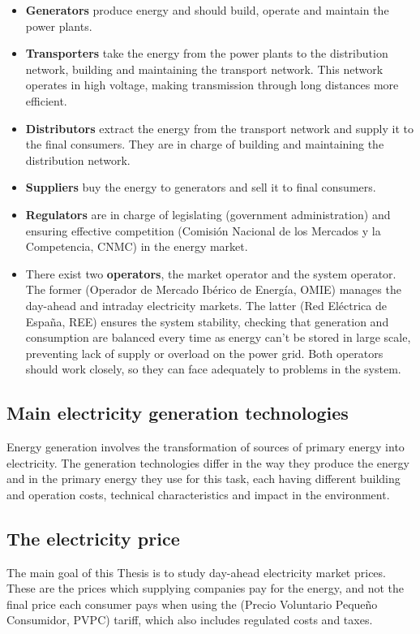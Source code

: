 \begin{itemize}
    \item \textbf{Generators} produce energy and should build, operate and maintain the power plants.
    \item \textbf{Transporters} take the energy from the power plants to the distribution network, building and maintaining the transport network. This network operates in high voltage, making transmission through long distances more efficient.
    \item \textbf{Distributors} extract the energy from the transport network and supply it to the final consumers. They are in charge of building and maintaining the distribution network.
    \item \textbf{Suppliers} buy the energy to generators and sell it to final consumers.
    \item \textbf{Regulators} are in charge of legislating (government administration) and ensuring effective competition (Comisión Nacional de los Mercados y la Competencia, CNMC) in the energy market.
    \item There exist two \textbf{operators}, the market operator and the system operator. The former (Operador de Mercado Ibérico de Energía, OMIE) manages the day-ahead and intraday electricity markets. The latter (Red Eléctrica de España, REE) ensures the system stability, checking that generation and consumption are balanced every time as energy can't be stored in large scale, preventing lack of supply or overload on the power grid. Both operators should work closely, so they can face adequately to problems in the system.
\end{itemize}

\subsection{Main electricity generation technologies}
Energy generation involves the transformation of sources of primary energy into electricity.
The generation technologies differ in the way they produce the energy and in the primary energy they use for this task, each having different building and operation costs, technical characteristics and impact in the environment. \cite{subasta-electrica-totalenergies}


\subsection{The electricity price}
The main goal of this Thesis is to study day-ahead electricity market prices.
These are the prices which supplying companies pay for the energy, and not the final price each consumer pays when using the (Precio Voluntario Pequeño Consumidor, PVPC) tariff, which also includes regulated costs and taxes. \cite{mercado-electrico-xataka}

